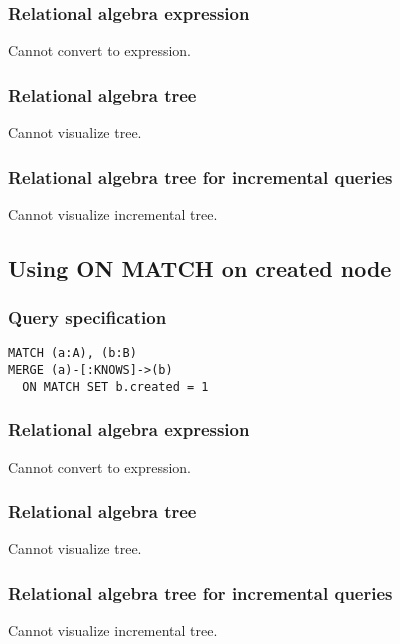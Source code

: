 \subsubsection*{Relational algebra expression}

Cannot convert to expression.

\subsubsection*{Relational algebra tree}

Cannot visualize tree.

\subsubsection*{Relational algebra tree for incremental queries}

Cannot visualize incremental tree.

\subsection{Using ON MATCH on created node}

\subsubsection*{Query specification}

\begin{lstlisting}
MATCH (a:A), (b:B)
MERGE (a)-[:KNOWS]->(b)
  ON MATCH SET b.created = 1
\end{lstlisting}

\subsubsection*{Relational algebra expression}

Cannot convert to expression.

\subsubsection*{Relational algebra tree}

Cannot visualize tree.

\subsubsection*{Relational algebra tree for incremental queries}

Cannot visualize incremental tree.

